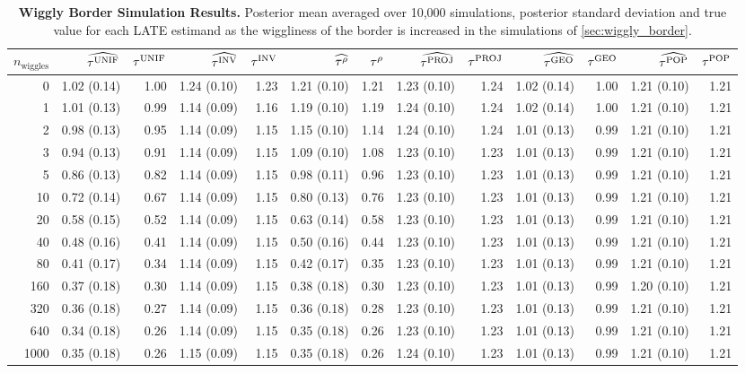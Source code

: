 \begin{landscape}
	\begin{table}[p]
    	\begin{tabular}{r|rrrrrrrrrrrr}
        	\hline
        	\(n_{\mathrm{wiggles}}\) & \(\widehat{\tau^{\mathrm{UNIF}}}\) & \(\tau^{\mathrm{UNIF}}\) & \(\widehat{\tau^{\mathrm{INV}}}\) & \(\tau^{\mathrm{INV}}\) & \(\widehat{\tau^{\rho}}\) & \(\tau^{\rho}\) & \(\widehat{\tau^{\mathrm{PROJ}}}\) & \(\tau^{\mathrm{PROJ}}\) & \(\widehat{\tau^{\mathrm{GEO}}}\) & \(\tau^{\mathrm{GEO}}\) & \(\widehat{\tau^{\mathrm{POP}}}\) & \(\tau^{\mathrm{POP}}\)\\
        	\hline
			0 & 1.02 (0.14) & 1.00 & 1.24 (0.10) & 1.23 & 1.21 (0.10) & 1.21 & 1.23 (0.10) & 1.24 & 1.02 (0.14) & 1.00 & 1.21 (0.10) & 1.21 \\
			1 & 1.01 (0.13) & 0.99 & 1.14 (0.09) & 1.16 & 1.19 (0.10) & 1.19 & 1.24 (0.10) & 1.24 & 1.02 (0.14) & 1.00 & 1.21 (0.10) & 1.21 \\
			2 & 0.98 (0.13) & 0.95 & 1.14 (0.09) & 1.15 & 1.15 (0.10) & 1.14 & 1.24 (0.10) & 1.24 & 1.01 (0.13) & 0.99 & 1.21 (0.10) & 1.21 \\
			3 & 0.94 (0.13) & 0.91 & 1.14 (0.09) & 1.15 & 1.09 (0.10) & 1.08 & 1.23 (0.10) & 1.23 & 1.01 (0.13) & 0.99 & 1.21 (0.10) & 1.21 \\
			5 & 0.86 (0.13) & 0.82 & 1.14 (0.09) & 1.15 & 0.98 (0.11) & 0.96 & 1.23 (0.10) & 1.23 & 1.01 (0.13) & 0.99 & 1.21 (0.10) & 1.21 \\
			10 & 0.72 (0.14) & 0.67 & 1.14 (0.09) & 1.15 & 0.80 (0.13) & 0.76 & 1.23 (0.10) & 1.23 & 1.01 (0.13) & 0.99 & 1.21 (0.10) & 1.21 \\
			20 & 0.58 (0.15) & 0.52 & 1.14 (0.09) & 1.15 & 0.63 (0.14) & 0.58 & 1.23 (0.10) & 1.23 & 1.01 (0.13) & 0.99 & 1.21 (0.10) & 1.21 \\
			40 & 0.48 (0.16) & 0.41 & 1.14 (0.09) & 1.15 & 0.50 (0.16) & 0.44 & 1.23 (0.10) & 1.23 & 1.01 (0.13) & 0.99 & 1.21 (0.10) & 1.21 \\
			80 & 0.41 (0.17) & 0.34 & 1.14 (0.09) & 1.15 & 0.42 (0.17) & 0.35 & 1.23 (0.10) & 1.23 & 1.01 (0.13) & 0.99 & 1.21 (0.10) & 1.21 \\
			160 & 0.37 (0.18) & 0.30 & 1.14 (0.09) & 1.15 & 0.38 (0.18) & 0.30 & 1.23 (0.10) & 1.23 & 1.01 (0.13) & 0.99 & 1.20 (0.10) & 1.21 \\
			320 & 0.36 (0.18) & 0.27 & 1.14 (0.09) & 1.15 & 0.36 (0.18) & 0.28 & 1.23 (0.10) & 1.23 & 1.01 (0.13) & 0.99 & 1.21 (0.10) & 1.21 \\
			640 & 0.34 (0.18) & 0.26 & 1.14 (0.09) & 1.15 & 0.35 (0.18) & 0.26 & 1.23 (0.10) & 1.23 & 1.01 (0.13) & 0.99 & 1.21 (0.10) & 1.21 \\
			1000 & 0.35 (0.18) & 0.26 & 1.15 (0.09) & 1.15 & 0.35 (0.18) & 0.26 & 1.24 (0.10) & 1.23 & 1.01 (0.13) & 0.99 & 1.21 (0.10) & 1.21 \\
			\hline
    	\end{tabular}
    	\caption{
        	\textbf{Wiggly Border Simulation Results.} 
        	Posterior mean averaged over 10,000 simulations, posterior standard deviation and true value for each LATE estimand as the wiggliness of the border is increased in the simulations of \autoref{sec:wiggly_border}.
        	\label{table:wiggly_results}
        	}
	\end{table}
\end{landscape}
